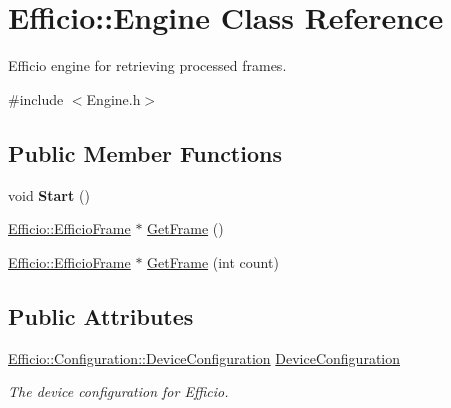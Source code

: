 \hypertarget{class_efficio_1_1_engine}{}\section{Efficio\+:\+:Engine Class Reference}
\label{class_efficio_1_1_engine}


Efficio engine for retrieving processed frames.  




{\ttfamily \#include $<$Engine.\+h$>$}

\subsection*{Public Member Functions}
\begin{DoxyCompactItemize}
\item 
void {\bfseries Start} ()\hypertarget{class_efficio_1_1_engine_a3b6e5c963c14df6e902f72df6a521fd1}{}\label{class_efficio_1_1_engine_a3b6e5c963c14df6e902f72df6a521fd1}

\item 
\hyperlink{class_efficio_1_1_efficio_frame}{Efficio\+::\+Efficio\+Frame} $\ast$ \hyperlink{class_efficio_1_1_engine_af1f2b8f431538027380a0359e860b22a}{Get\+Frame} ()
\item 
\hyperlink{class_efficio_1_1_efficio_frame}{Efficio\+::\+Efficio\+Frame} $\ast$ \hyperlink{class_efficio_1_1_engine_a9458a45428dbd47075efa1388acd6909}{Get\+Frame} (int count)
\end{DoxyCompactItemize}
\subsection*{Public Attributes}
\begin{DoxyCompactItemize}
\item 
\hyperlink{class_efficio_1_1_configuration_1_1_device_configuration}{Efficio\+::\+Configuration\+::\+Device\+Configuration} \hyperlink{class_efficio_1_1_engine_afbaba10c9c508bdcc16625a2e51a6148}{Device\+Configuration}\hypertarget{class_efficio_1_1_engine_afbaba10c9c508bdcc16625a2e51a6148}{}\label{class_efficio_1_1_engine_afbaba10c9c508bdcc16625a2e51a6148}

\begin{DoxyCompactList}\small\item\em The device configuration for Efficio. \end{DoxyCompactList}\end{DoxyCompactItemize}


